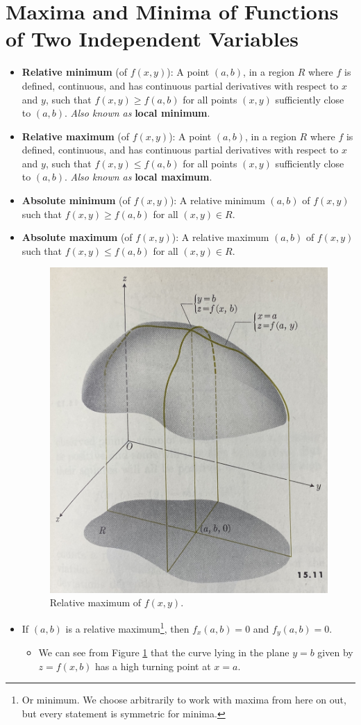 \documentclass[../main.tex]{subfiles}
\begin{document}
\section{Maxima and Minima of Functions of Two Independent Variables}
\begin{itemize}
    \item {}\textbf{Relative minimum} (of $f(x,y)$): A point $(a,b)$, in a region $R$ where $f$ is defined, continuous, and has continuous partial derivatives with respect to $x$ and $y$, such that $f(x,y)\geq f(a,b)$ for all points $(x,y)$ sufficiently close to $(a,b)$. \emph{Also known as} \textbf{local minimum}.
    \item \textbf{Relative maximum} (of $f(x,y)$): A point $(a,b)$, in a region $R$ where $f$ is defined, continuous, and has continuous partial derivatives with respect to $x$ and $y$, such that $f(x,y)\leq f(a,b)$ for all points $(x,y)$ sufficiently close to $(a,b)$. \emph{Also known as} \textbf{local maximum}.
    \item \textbf{Absolute minimum} (of $f(x,y)$): A relative minimum $(a,b)$ of $f(x,y)$ such that $f(x,y)\geq f(a,b)$ for all $(x,y)\in R$.
    \item \textbf{Absolute maximum} (of $f(x,y)$): A relative maximum $(a,b)$ of $f(x,y)$ such that $f(x,y)\leq f(a,b)$ for all $(x,y)\in R$.
    \begin{figure}[h!]
        \centering
        \includegraphics[width=0.4\linewidth]{ExtFiles/relativeMaximum.jpg}
        \caption{Relative maximum of $f(x,y)$.}
        \label{fig:relativeMaximum}
    \end{figure}
    \item If $(a,b)$ is a relative maximum\footnote{Or minimum. We choose arbitrarily to work with maxima from here on out, but every statement is symmetric for minima.}, then $f_x(a,b)=0$ and $f_y(a,b)=0$.
    \begin{itemize}
        \item We can see from Figure \ref{fig:relativeMaximum} that the curve lying in the plane $y=b$ given by $z=f(x,b)$ has a high turning point at $x=a$.

\end{itemize}
\end{itemize}
\end{document}
